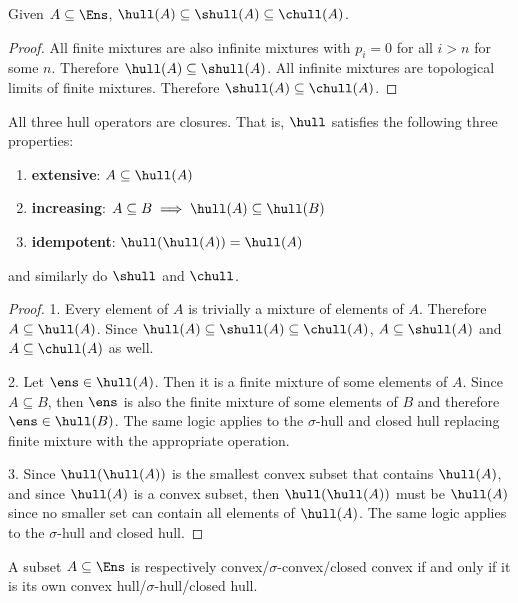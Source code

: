 \begin{mathSection}
\begin{coro}
	Given $A \subseteq \Ens$, $\hull(A) \subseteq \shull(A) \subseteq \chull(A)$.
\end{coro}

\begin{proof}
	All finite mixtures are also infinite mixtures with $p_i = 0$ for all $i > n$ for some $n$. Therefore $\hull(A) \subseteq \shull(A)$. All infinite mixtures are topological limits of finite mixtures. Therefore $\shull(A) \subseteq \chull(A)$. 
\end{proof}

\begin{prop}\label{pm-es-hullProp}
	All three hull operators are closures. That is, $\hull$ satisfies the following three properties:
	\begin{enumerate}
		\item \textbf{extensive}: $A \subseteq \hull(A)$
		\item \textbf{increasing}: $A \subseteq B \implies \hull(A) \subseteq \hull(B)$
		\item \textbf{idempotent}: $\hull(\hull(A)) = \hull(A)$
	\end{enumerate}
	and similarly do $\shull$ and $\chull$.
\end{prop}

\begin{proof}
	1. Every element of $A$ is trivially a mixture of elements of $A$. Therefore $A \subseteq \hull(A)$. Since $\hull(A) \subseteq \shull(A) \subseteq \chull(A)$, $A \subseteq \shull(A)$ and $A \subseteq \chull(A)$ as well. 
	
	2. Let $\ens \in \hull(A)$. Then it is a finite mixture of some elements of $A$. Since $A \subseteq B$, then $\ens$ is also the finite mixture of some elements of $B$ and therefore $\ens \in \hull(B)$. The same logic applies to the $\sigma$-hull and closed hull replacing finite mixture with the appropriate operation.
	
	3. Since $\hull(\hull(A))$ is the smallest convex subset that contains $\hull(A)$, and since $\hull(A)$ is a convex subset, then $\hull(\hull(A))$ must be $\hull(A)$ since no smaller set can contain all elements of $\hull(A)$. The same logic applies to the $\sigma$-hull and closed hull.
\end{proof}

\begin{coro}
	A subset $A \subseteq \Ens$ is respectively convex/$\sigma$-convex/closed convex if and only if it is its own convex hull/$\sigma$-hull/closed hull.
\end{coro}


\end{mathSection}
